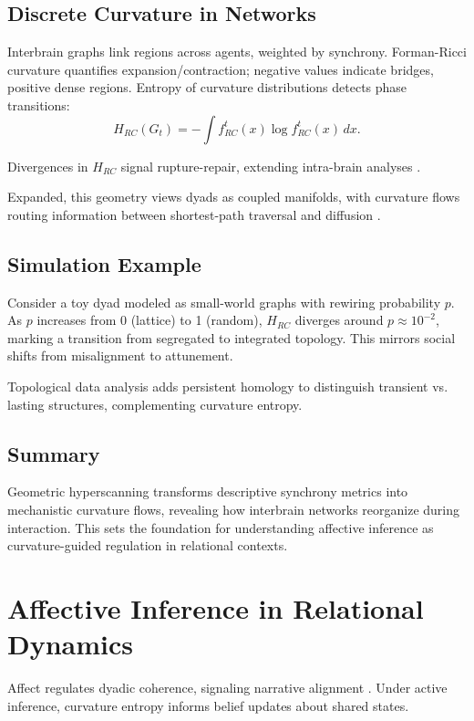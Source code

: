 \documentclass{article}
\theoremstyle{definition}
\begin{document}
\subsection{Discrete Curvature in Networks}

Interbrain graphs link regions across agents, weighted by synchrony. Forman-Ricci curvature quantifies expansion/contraction; negative values indicate bridges, positive dense regions. Entropy of curvature distributions detects phase transitions:
\[
H_{RC}(G_t) = -\int f^t_{RC}(x) \log f^t_{RC}(x) \, dx.
\]

Divergences in $H_{RC}$ signal rupture-repair, extending intra-brain analyses \cite{weber2019curvature,chatterjee2021detecting}.

Expanded, this geometry views dyads as coupled manifolds, with curvature flows routing information between shortest-path traversal and diffusion \cite{avena2019spectrum}.

\subsection{Simulation Example}

Consider a toy dyad modeled as small-world graphs with rewiring probability $p$. As $p$ increases from 0 (lattice) to 1 (random), $H_{RC}$ diverges around $p \approx 10^{-2}$, marking a transition from segregated to integrated topology. This mirrors social shifts from misalignment to attunement.

Topological data analysis adds persistent homology to distinguish transient vs. lasting structures, complementing curvature entropy.

\subsection{Summary}

Geometric hyperscanning transforms descriptive synchrony metrics into mechanistic curvature flows, revealing how interbrain networks reorganize during interaction. This sets the foundation for understanding affective inference as curvature-guided regulation in relational contexts.

\section{Affective Inference in Relational Dynamics}

Affect regulates dyadic coherence, signaling narrative alignment \cite{hinrichs2025hyperscanning}. Under active inference, curvature entropy informs belief updates about shared states.
\end{document}
